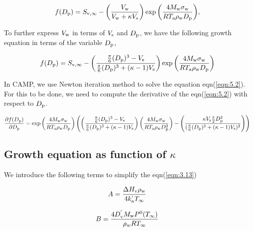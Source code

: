 \documentclass[12pt]{article}
\begin{document}
\begin{equation}\label{eqn:5.1}
f(D_{\rm p})=S_{\rm v, \infty}-\left(\frac{V_{\rm w}}{V_{\rm w} + \kappa V_{\rm s}}\right)\exp{\left(\frac{4 M_{\rm w} \sigma_{\rm w}}{R T_{\rm a} \rho_{\rm w} D_{\rm p}}\right)},
\end{equation}

To further express $V_{\rm w}$ in terms of $V_{\rm s}$ and $ D_{\rm p}$, we have the following growth equation in terms of the variable $D_{\rm p}$,

\begin{equation}\label{eqn:5.2}
f(D_{\rm p})=S_{\rm v, \infty}-\left(\frac{\frac{\pi}{6}(D_{\rm p})^{3}-V_{\rm s}} {\frac{\pi}{6}(D_{\rm p})^{3}+(\kappa-1)V_{\rm s}}\right)
\exp{\left(\frac{4 M_{\rm w} \sigma_{\rm w}}{R T_{\rm a} \rho_{\rm w} D_{\rm p}}\right)}
\end{equation}

In CAMP, we use Newton iteration method to solve the equation eqn(\ref{eqn:5.2}). For this to be done, we need to compute the derivative of the eqn(\ref{eqn:5.2}) with respect to $D_{\rm p}$.

\begin{equation}\label{eqn:5.2a}
\frac{\partial{f(D_{\rm p})}}     {\partial{D_{\rm p} } } = 
\exp{\left(\frac{4 M_{\rm w} \sigma_{\rm w}}{R T_{\rm a} \rho_{\rm w} D_{\rm p}}\right)} 
\left( \left(\frac{\frac{\pi} {6}(D_{\rm p})^{3}-V_{\rm s}} {\frac{\pi}{6}(D_{\rm p})^{3}+(\kappa-1)V_{\rm s}}\right)
\left(\frac{4 M_{\rm w} \sigma_{\rm w} } { R T_{\rm a} \rho_{\rm w} D_{\rm p}^{2} } \right) - 
\left(\frac{ \kappa V_{\rm s} \frac{\pi}{2}D_{\rm p}^{2} } {(\frac{\pi}{6}(D_{\rm p})^{3}+(\kappa-1)V_{\rm s} )^{2}} \right) 
\right)
\end{equation}  

\subsection{Growth equation as function of $\kappa$}

We introduce the following terms to simplify the eqn(\ref{eqn:3.13})

\begin{equation}\label{eqn:5.3}
A=\frac{\Delta H_{\rm v} \rho_{\rm w}}{4 k_{\rm a}^{'} T_{\infty}}
\end{equation}

\begin{equation}\label{eqn:5.4}
B=\frac{4 D_{\rm v}^{'} M_{\rm w} P^{\rm 0}(T_{\infty})}{\rho_w R T_{\infty}}
\end{equation}
\end{document}
